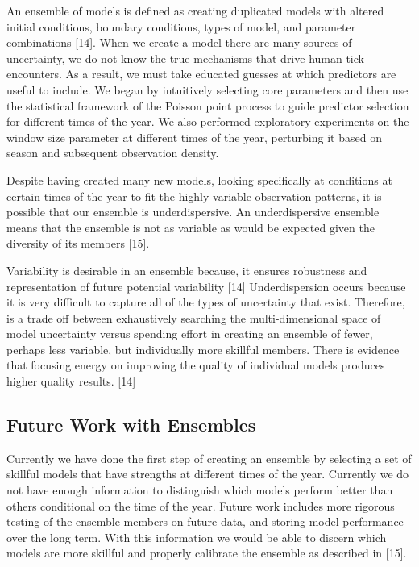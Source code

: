 \noindent An ensemble of models is defined as creating duplicated models with altered initial conditions, boundary conditions, types of model, and parameter combinations [14]. When we create a model there are many sources of uncertainty, we do not know the true mechanisms that drive human-tick encounters. As a result, we must take educated guesses at which predictors are useful to include. We began by intuitively selecting core parameters and then use the statistical framework of the Poisson point process to guide predictor selection for different times of the year.  We also performed exploratory experiments on the window size parameter at different times of the year, perturbing it based on season and subsequent observation density.  \newline

\noindent Despite having created many new models, looking specifically at conditions at certain times of the year to fit the highly variable observation patterns, it is possible that our ensemble is underdispersive. An underdispersive ensemble means that the ensemble is not as variable as would be expected given the diversity of its members [15]. \newline

\noindent Variability is desirable in an ensemble because, it ensures robustness and representation of future potential variability [14] Underdispersion occurs because it is very difficult to capture all of the types of uncertainty that exist. Therefore, is a trade off between exhaustively searching the multi-dimensional space of model uncertainty versus spending effort in creating an ensemble of fewer, perhaps less variable, but individually more skillful members. There is evidence that focusing energy on improving the quality of individual models produces higher quality results. [14]


\subsection{Future Work with Ensembles}
 
Currently we have done the first step of creating an ensemble by selecting a set of skillful models that have strengths at different times of the year. Currently we do not have enough information to distinguish which models perform better than others conditional on the time of the year. Future work includes more rigorous testing of the ensemble members on future data, and storing model performance over the long term. With this information we would be able to discern which models are more skillful and properly calibrate the ensemble as described in [15]. 



